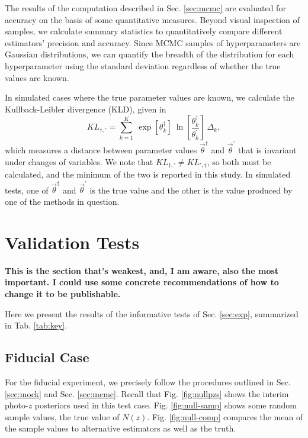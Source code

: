 \documentclass[preprint]{aastex}
\begin{document}
The results of the computation described in Sec. \ref{sec:mcmc} are evaluated 
for accuracy on the basis of some quantitative measures.  Beyond visual 
inspection of samples, we calculate summary statistics to quantitatively 
compare different estimators' precision and accuracy.  Since MCMC samples of 
hyperparameters are Gaussian distributions, we can quantify the breadth of the 
distribution for each hyperparameter using the standard deviation regardless of 
whether the true values are known.  

In simulated cases where the true parameter values are known, we calculate the 
Kullback-Leibler divergence (KLD), given in 
\begin{equation}
\label{eq:kl}
KL_{\dagger,'} = \sum_{k=1}^{K}\ \exp[\theta_{k}^{\dagger}]\ 
\ln\left[\frac{\theta_{k}^{\dagger}}{\theta_{k}^{'}}\right]\ \Delta_{k},
\end{equation}
which measures a distance between parameter values $\vec{\theta}^{\dagger}$ and 
$\vec{\theta}^{'}$ that is invariant under changes of variables.  We note that 
$KL_{\dagger,'}\neq KL_{',\dagger}$, so both must be calculated, and the 
minimum of the two is reported in this study.  In simulated tests, one of 
$\vec{\theta}^{\dagger}$ and $\vec{\theta}^{'}$ is the true value and the other 
is the value produced by one of the methods in question.  

\section{Validation Tests}
\label{sec:valid}

\textbf{This is the section that's weakest, and, I am aware, also the most 
important.  I could use some concrete recommendations of how to change it to be 
publishable.}

Here we present the results of the informative tests of Sec. \ref{sec:exp}, 
summarized in Tab. \ref{tab:key}.  

\subsection{Fiducial Case}
\label{sec:null}

For the fiducial experiment, we precisely follow the procedures outlined in 
Sec. \ref{sec:mock} and Sec. \ref{sec:mcmc}.  Recall that Fig. 
\ref{fig:nullpzs} shows the interim photo-$z$ posteriors used in this test 
case.  Fig. \ref{fig:null-samp} shows some random sample values, the true value 
of $N(z)$.  Fig. \ref{fig:null-comp} compares the mean of the sample values to 
alternative estimators as well as the truth.
\end{document}

